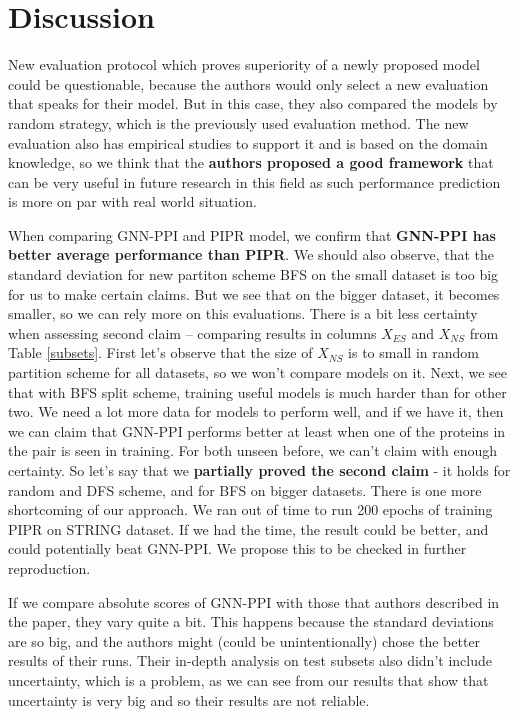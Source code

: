 \section{Discussion}

New evaluation protocol which proves superiority of a newly proposed model could be questionable, because the authors would only select a new evaluation that speaks for their model. But in this case, they also compared the models by random strategy, which is the previously used evaluation method. The new evaluation also has empirical studies to support it and is based on the domain knowledge, so we think that the \textbf{authors proposed a good framework} that can be very useful in future research in this field as such performance prediction is more on par with real world situation.

When comparing GNN-PPI and PIPR model, we confirm that \textbf{GNN-PPI has better average performance than PIPR}. We should also observe, that the standard deviation for new partiton scheme BFS on the small dataset is too big for us to make certain claims. But we see that on the bigger dataset, it becomes smaller, so we can rely more on this evaluations. 
There is a bit less certainty when assessing second claim -- comparing results in columns $X_{ES}$ and $X_{NS}$ from Table \ref{subsets}. First let's observe that the size of $X_{NS}$ is to small in random partition scheme for all datasets, so we won't compare models on it. Next, we see that with BFS split scheme, training useful models is much harder than for other two. We need a lot more data for models to perform well, and if we have it, then we can claim that GNN-PPI performs better at least when one of the proteins in the pair is seen in training. For both unseen before, we can't claim with enough certainty. So let's say that we \textbf{partially proved the second claim} - it holds for random and DFS scheme, and for BFS on bigger datasets.
There is one more shortcoming of our approach. We ran out of time to run 200 epochs of training PIPR on STRING dataset. If we had the time, the result could be better, and could potentially beat GNN-PPI. We propose this to be checked in further reproduction.

If we compare absolute scores of GNN-PPI with those that authors described in the paper, they vary quite a bit. This happens because the standard deviations are so big, and the authors might (could be unintentionally) chose the better results of their runs. Their in-depth analysis on test subsets also didn't include uncertainty, which is a problem, as we can see from our results that show that uncertainty is very big and so their results are not reliable.


